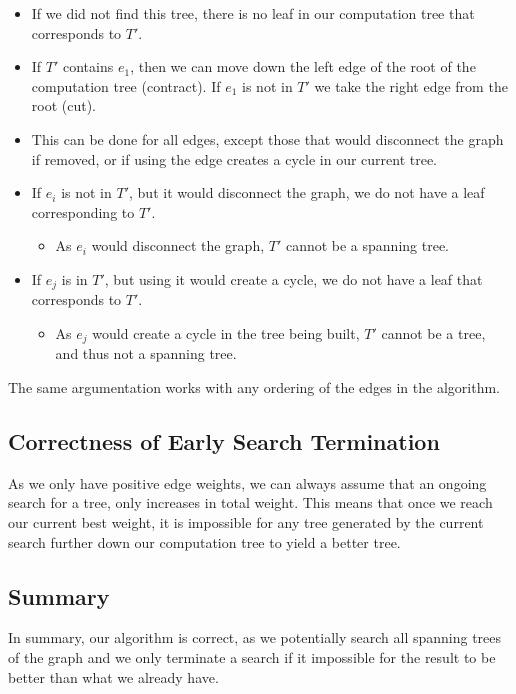 \begin{itemize}
\item If we did not find this tree, there is no leaf in our computation tree that corresponds to $T'$.

\item If $T'$ contains $e_1$, then we can move down the left edge of the root of the computation tree (contract). If $e_1$ is not in $T'$ we take the right edge from the root (cut).

\item This can be done for all edges, except those that would disconnect the graph if removed, or if using the edge creates a cycle in our current tree.

\item If $e_i$ is not in $T'$, but it would disconnect the graph, we do not have a leaf corresponding to $T'$.
\begin{itemize}
\item As $e_i$ would disconnect the graph, $T'$ cannot be a spanning tree.
\end{itemize}

\item If $e_j$ is in $T'$, but using it would create a cycle, we do not have a leaf that corresponds to $T'$.

\begin{itemize}
\item As $e_j$ would create a cycle in the tree being built, $T'$ cannot be a tree, and thus not a spanning tree.
\end{itemize}
\end{itemize}

The same argumentation works with any ordering of the edges in the algorithm.

\subsection{Correctness of Early Search Termination}
As we only have positive edge weights, we can always assume that an ongoing search for a tree, only increases in total weight. This means that once we reach our current best weight, it is impossible for any tree generated by the current search further down our computation tree to yield a better tree.

\subsection{Summary}
In summary, our algorithm is correct, as we potentially search all spanning trees of the graph and we only terminate a search if it impossible for the result to be better than what we already have.

